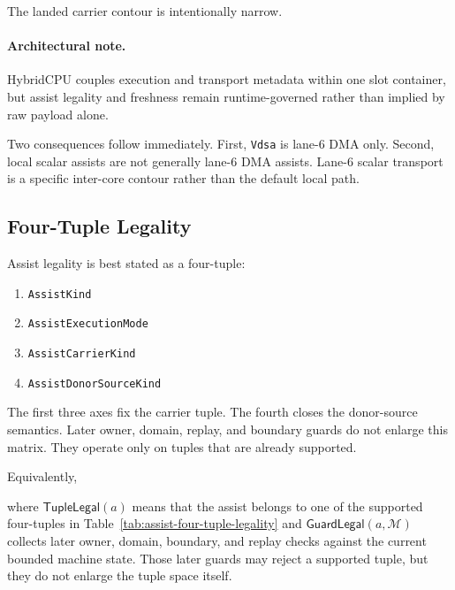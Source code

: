 \documentclass[twocolumn]{article}
\begin{document}
The landed carrier contour is intentionally narrow.



\paragraph{Architectural note.}
HybridCPU couples execution and transport metadata within one slot container, but assist legality and freshness remain runtime-governed rather than implied by raw payload alone.

Two consequences follow immediately. First, \texttt{Vdsa} is lane-6 DMA only. Second, local scalar assists are not generally lane-6 DMA assists. Lane-6 scalar transport is a specific inter-core contour rather than the default local path.


\subsection{Four-Tuple Legality}

Assist legality is best stated as a four-tuple:

\begin{enumerate}
\item \texttt{AssistKind}
\item \texttt{AssistExecutionMode}
\item \texttt{AssistCarrierKind}
\item \texttt{AssistDonorSourceKind}
\end{enumerate}

The first three axes fix the carrier tuple. The fourth closes the donor-source semantics. Later owner, domain, replay, and boundary guards do not enlarge this matrix. They operate only on tuples that are already supported.



Equivalently,

where \(\mathsf{TupleLegal}(a)\) means that the assist belongs to one of the supported four-tuples in Table~\ref{tab:assist-four-tuple-legality} and \(\mathsf{GuardLegal}(a,\mathcal{M})\) collects later owner, domain, boundary, and replay checks against the current bounded machine state. Those later guards may reject a supported tuple, but they do not enlarge the tuple space itself.
\end{document}

